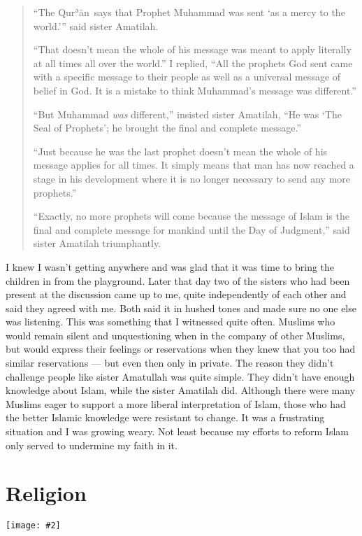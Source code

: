\documentclass[12pt]{memoir}
\def\´{ʾ} %
\newcommand{\cor}[2]{#2} %
\def \Quran{Qur\-\´ān} %
\newcommand{\img}[3]{\begin{center}%
\texttt{[image: \#2]}\\{\small\em#3}%
\end{center}}
\begin{document}
\begin{quote}
“The \Quran\ says that Prophet Muhammad was sent ‘as a mercy to the world.’”
said sister Amatilah.

“That doesn’t mean the whole of his message was meant to apply literally
at all times all over the world.”
I replied,
“All the prophets God sent came with a specific message to their people
as well as a universal message of belief in God.
It is a mistake to think Muhammad’s message was different.”

“But Muhammad \emph{was} different,” insisted sister Amatilah,
“He was ‘The Seal of Prophets’; he brought the final and complete message.”

“Just because he was the last prophet doesn’t mean
the whole of his message applies for all times.
It simply means that man has now reached a stage in his development
where it is no\cor{-}{ }longer necessary to send any more prophets.”

“Exactly, no more prophets will come because the message of Islam is the final
and complete message for mankind until the Day of Judgment,”
said sister Amatilah triumphantly.
\end{quote}

I knew I wasn’t getting anywhere and was glad that it was time
to bring the children in from the playground.
Later that day two of the sisters who had been present at the discussion
came up to me, quite independently of each other and said they agreed with me.
Both said it in hushed tones and made sure no one else was listening.
This was something that I witnessed quite often.
Muslims who would remain silent and unquestioning
when in the company of other Muslims,
but would express their feelings or reservations when they knew
that you too had similar reservations — but even then only in private.
The reason they didn’t challenge people like sister Amatullah was quite simple.
They didn’t have enough knowledge about Islam, while the sister Amatilah did.
Although there were many Muslims eager to support
a more liberal interpretation of Islam,
those who had the better Islamic knowledge were resistant to change.
It was a frustrating situation and I was growing weary.
Not least because my efforts to reform Islam only served
to undermine my faith in it.


\chapter{Religion}

\img{scale=0.6}{Neasden_Temple.jpg}{}
\end{document}
